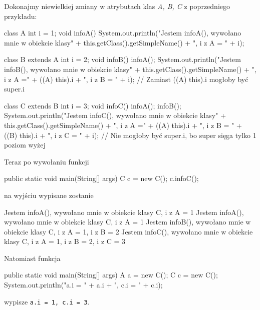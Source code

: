 \begin{example}
    Dokonajmy niewielkiej zmiany w atrybutach klas \textit{A, B, C} z poprzedniego przykładu:
    \begin{java}
        class A {
            int i = 1;
            void infoA() {
                System.out.println("Jestem infoA(), wywołano mnie w obiekcie klasy" +
                        this.getClass().getSimpleName() + ", i z A = " + i);
            }
        }
    
        class B extends A {
            int i = 2;
            void infoB() {
                infoA();
                System.out.println("Jestem infoB(), wywołano mnie w obiekcie klasy" +
                        this.getClass().getSimpleName() + ", i z A =" + ((A) this).i +
                        ", i z B = " + i);
                        // Zamiast ((A) this).i mogłoby być super.i
            }
        }
    
        class C extends B {
            int i = 3;
            void infoC() {
                infoA();
                infoB();
                System.out.println("Jestem infoC(), wywołano mnie w obiekcie klasy" +
                        this.getClass().getSimpleName() + ", i z A =" + ((A) this).i +
                        ", i z B = " + ((B) this).i + ", i z C = " + i);
                        // Nie mogłoby być super.i, bo super sięga tylko 1 poziom wyżej
            }
        }
    \end{java}

    Teraz po wywołaniu funkcji
    \begin{java}
        public static void main(String[] args) {
            C c = new C();
            c.infoC();
        }
    \end{java}
    na wyjściu wypisane zostanie
    \begin{plain}
        Jestem infoA(), wywołano mnie w obiekcie klasy C, i z A = 1
        Jestem infoA(), wywołano mnie w obiekcie klasy C, i z A = 1
        Jestem infoB(), wywołano mnie w obiekcie klasy C, i z A = 1, i z B = 2
        Jestem infoC(), wywołano mnie w obiekcie klasy C, i z A = 1, i z B = 2, i z C = 3
    \end{plain}

    Natomiast funkcja
    \begin{java}
        public static void main(String[] args) {
            A a = new C();
            C c = new C();
            System.out.println("a.i = " + a.i + ", c.i = " + c.i);
        }
    \end{java}
    wypisze \texttt{a.i = 1, c.i = 3}.
\end{example}

